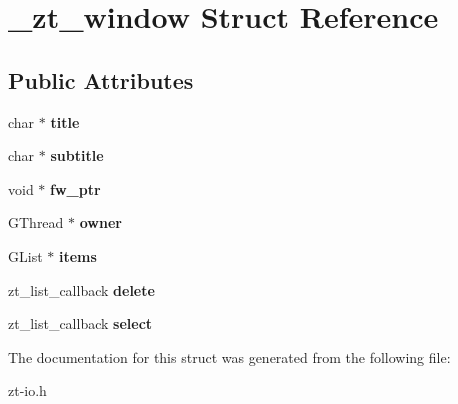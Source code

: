 \hypertarget{struct__zt__window}{\section{\-\_\-zt\-\_\-window Struct Reference}
\label{struct__zt__window}
}
\subsection*{Public Attributes}
\begin{DoxyCompactItemize}
\item 
\hypertarget{struct__zt__window_aef745d296b1704d0451204db5013ad8e}{char $\ast$ {\bfseries title}}\label{struct__zt__window_aef745d296b1704d0451204db5013ad8e}

\item 
\hypertarget{struct__zt__window_a4f23d9572a2328adb912355b8051f79a}{char $\ast$ {\bfseries subtitle}}\label{struct__zt__window_a4f23d9572a2328adb912355b8051f79a}

\item 
\hypertarget{struct__zt__window_a50000ea1197995578c63f88d3d1eba13}{void $\ast$ {\bfseries fw\-\_\-ptr}}\label{struct__zt__window_a50000ea1197995578c63f88d3d1eba13}

\item 
\hypertarget{struct__zt__window_a07643eda150b3164427e0b82e689201b}{G\-Thread $\ast$ {\bfseries owner}}\label{struct__zt__window_a07643eda150b3164427e0b82e689201b}

\item 
\hypertarget{struct__zt__window_a11c55a35c56e68f5e5439c5d19799673}{G\-List $\ast$ {\bfseries items}}\label{struct__zt__window_a11c55a35c56e68f5e5439c5d19799673}

\item 
\hypertarget{struct__zt__window_afd8600ab5171e98670200294accd774e}{zt\-\_\-list\-\_\-callback {\bfseries delete}}\label{struct__zt__window_afd8600ab5171e98670200294accd774e}

\item 
\hypertarget{struct__zt__window_a01d5f47aec5774da92a030d885510673}{zt\-\_\-list\-\_\-callback {\bfseries select}}\label{struct__zt__window_a01d5f47aec5774da92a030d885510673}

\end{DoxyCompactItemize}


The documentation for this struct was generated from the following file\-:\begin{DoxyCompactItemize}
\item 
zt-\/io.\-h\end{DoxyCompactItemize}
